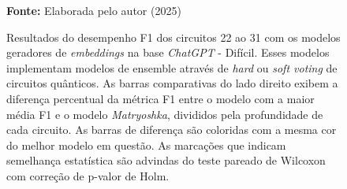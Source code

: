 \begin{figure}
\caption{Resultados do desempenho F1 dos circuitos 22 ao 31 com os modelos geradores de \textit{embeddings} na base \textit{ChatGPT} - Difícil. Esses modelos implementam modelos de ensemble através de \textit{hard} ou \textit{soft voting} de circuitos quânticos. As barras comparativas do lado direito exibem a diferença percentual da métrica F1 entre o modelo com a maior média F1 e o modelo \textit{Matryoshka}, divididos pela profundidade de cada circuito. As barras de diferença são coloridas com a mesma cor do melhor modelo em questão. As marcações que indicam semelhança estatística são advindas do teste pareado de Wilcoxon com correção de p-valor de Holm.}
\label{fig:model_transformer:hard:g7}
     \centering
    \centering

      \par\medskip\ABNTEXfontereduzida\selectfont\textbf{Fonte:} Elaborada pelo autor (2025) \par\medskip
\end{figure}